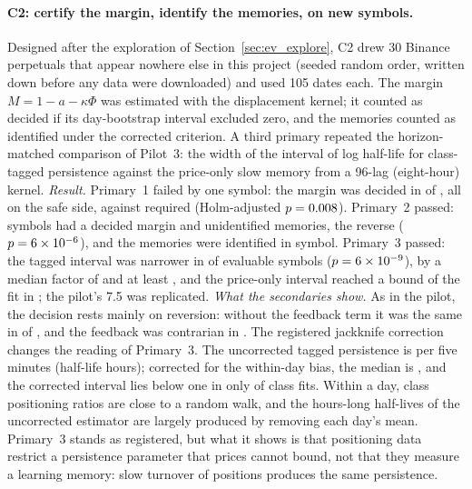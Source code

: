 \paragraph{C2: certify the margin, identify the memories, on new symbols.} Designed after the exploration of Section~\ref{sec:ev_explore}, C2 drew 30 Binance perpetuals that appear nowhere else in this project (seeded random order, written down before any data were downloaded) and used 105 dates each. The margin $M=1-a-\kappa\Phi$ was estimated with the displacement kernel; it counted as decided if its day-bootstrap interval excluded zero, and the memories counted as identified under the corrected criterion. A third primary repeated the horizon-matched comparison of Pilot~3: the width of the interval of log half-life for class-tagged persistence against the price-only slow memory from a 96-lag (eight-hour) kernel. \emph{Result.} Primary~1 failed by one symbol: the margin was decided in \CtwoDecided{} of \CtwoSymbols{}, all on the safe side, against \CtwoNeed{} required (Holm-adjusted $p=0.008$). Primary~2 passed: \CtwoB{} symbols had a decided margin and unidentified memories, \CtwoC{} the reverse ($p=6\times10^{-6}$), and the memories were identified in \CtwoIdentified{} symbol. Primary~3 passed: the tagged interval was narrower in \CtwoPthreeTighter{} of \CtwoPthreeSymbols{} evaluable symbols ($p=6\times10^{-9}$), by a median factor of \CtwoRatio{} and at least \CtwoMinRatio{}, and the price-only interval reached a bound of the fit in \CtwoBound{}; the pilot's 7.5 was replicated. \emph{What the secondaries show.} As in the pilot, the decision rests mainly on reversion: without the feedback term it was the same in \CtwoSameNoFb{} of \CtwoSymbols{}, and the feedback was contrarian in \CtwoFbNeg{}. The registered jackknife correction changes the reading of Primary~3. The uncorrected tagged persistence is \CtwoTagR{} per five minutes (half-life \CtwoTagHL{} hours); corrected for the within-day bias, the median is \CtwoJackR{}, and the corrected interval lies below one in only \CtwoJackBelow{} of \CtwoClassFits{} class fits. Within a day, class positioning ratios are close to a random walk, and the hours-long half-lives of the uncorrected estimator are largely produced by removing each day's mean. Primary~3 stands as registered, but what it shows is that positioning data restrict a persistence parameter that prices cannot bound, not that they measure a learning memory: slow turnover of positions produces the same persistence.


